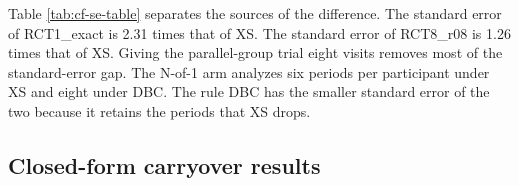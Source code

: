 \documentclass[
  11pt,
]{article}
\begin{document}
Table \ref{tab:cf-se-table} separates the sources of the difference. The standard error of RCT1\_exact is 2.31 times that of XS. The standard error of RCT8\_r08 is 1.26 times that of XS. Giving the parallel-group trial eight visits removes most of the standard-error gap. The N-of-1 arm analyzes six periods per participant under XS and eight under DBC. The rule DBC has the smaller standard error of the two because it retains the periods that XS drops.

\subsection{Closed-form carryover results}\label{closed-form-carryover-results}

\begin{table}[!h]
\centering
\caption{\label{tab:cf-s1-table}Closed-form bias, power, and 95\% interval coverage by rule and true half-life at $\beta_D = -1$. Periods is the mean number analyzed per participant. XO is an oracle.}
\centering
{}
\end{table}
\end{document}
